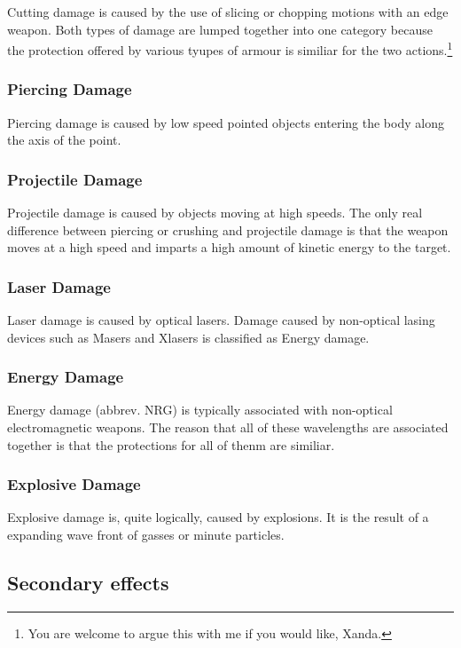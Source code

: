 Cutting damage is caused by the use of slicing or chopping motions 
with an edge weapon. Both types of damage are lumped together into 
one category because the protection offered by various tyupes of 
armour is similiar for the two actions.\footnote{You are welcome 
to argue this with me if you would like,  Xanda.}

\subsubsection{Piercing Damage}

Piercing damage is caused by low speed pointed objects entering the 
body along the axis of the point. 

\subsubsection{Projectile Damage}

Projectile damage is caused by objects moving at high speeds. The 
only real difference between piercing or crushing and projectile 
damage is that the weapon moves at a high speed and imparts a
high amount of kinetic energy to the target.

\subsubsection{Laser Damage}

Laser damage is caused by optical lasers. Damage caused by 
non-optical lasing devices such as Masers and Xlasers is classified 
as Energy damage. 

\subsubsection{Energy Damage}

Energy damage (abbrev. NRG) is typically associated with non-optical 
electromagnetic weapons. The reason that all of these wavelengths are 
associated together is that the protections for all of thenm are 
similiar.          

\subsubsection{Explosive Damage}

Explosive damage is, quite logically, caused by explosions. It is 
the result of a expanding wave front of gasses or minute particles.

\subsection{Secondary effects}

